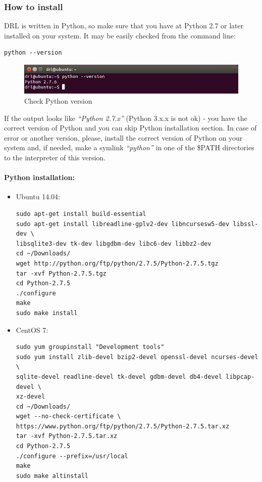 \documentclass[a4paper,oneside,dvipsnames]{article}
\begin{document}
\subsubsection[How to install]{How to install}
\label{installation}
DRL is written in Python, so make sure that you have at Python 2.7 or later installed on your system. It may be easily checked from the command line:
\begin{verbatim}
python --version
\end{verbatim}
\begin{figure}[H]
  \centering
  \includegraphics[width=1\textwidth]{python_version.png}
  \caption*{Check Python version}
  \label{fig:pythonVersion}
\end{figure}
If the output looks like \textit{``Python 2.7.x''} (Python 3.x.x is not ok) - you have the correct version of Python and you can skip Python installation section. In case of error or another version, please, install the correct version of Python on your system and, if needed, make a symlink \textit{``python''} in one of the \$PATH directories to the interpreter of this version.

\paragraph*{Python installation:}
\begin{itemize}
\item Ubuntu 14.04:
\begin{verbatim}
sudo apt-get install build-essential
sudo apt-get install libreadline-gplv2-dev libncursesw5-dev libssl-dev \
libsqlite3-dev tk-dev libgdbm-dev libc6-dev libbz2-dev
cd ~/Downloads/
wget http://python.org/ftp/python/2.7.5/Python-2.7.5.tgz
tar -xvf Python-2.7.5.tgz
cd Python-2.7.5
./configure
make
sudo make install
\end{verbatim}

\noindent
\item CentOS 7:
\begin{verbatim}
sudo yum groupinstall "Development tools"
sudo yum install zlib-devel bzip2-devel openssl-devel ncurses-devel \
sqlite-devel readline-devel tk-devel gdbm-devel db4-devel libpcap-devel \
xz-devel
cd ~/Downloads/
wget --no-check-certificate \
https://www.python.org/ftp/python/2.7.5/Python-2.7.5.tar.xz
tar -xvf Python-2.7.5.tar.xz
cd Python-2.7.5
./configure --prefix=/usr/local
make 
sudo make altinstall
\end{verbatim}
\end{itemize}
\end{document}
